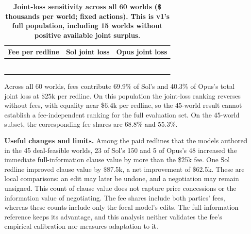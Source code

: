 \renewcommand{\thetable}{E.12}
\begin{longtable}[]{@{}
  >{\raggedright\arraybackslash}p{}
  >{\raggedleft\arraybackslash}p{}
  >{\raggedleft\arraybackslash}p{}@{}}
\caption{\textbf{Joint-loss sensitivity across all 60 worlds (\$ thousands per world; fixed actions). This is v1's full population, including 15 worlds without positive available joint surplus.}}\label{tab:E.12}\tabularnewline
\toprule\noalign{}
\begin{minipage}[b]{\linewidth}\raggedright
Fee per redline
\end{minipage} & \begin{minipage}[b]{\linewidth}\raggedleft
Sol joint loss
\end{minipage} & \begin{minipage}[b]{\linewidth}\raggedleft
Opus joint loss
\end{minipage} \\
\midrule\noalign{}
\endhead
\bottomrule\noalign{}
\endlastfoot
0 & 31.1 & 42.3 \\
5 & 45.6 & 48.0 \\
12.5 & 67.3 & 56.6 \\
25 & 103.4 & 70.8 \\
50 & 175.7 & 99.4 \\
100 & 320.3 & 156.5 \\
\end{longtable}

Across all 60 worlds, fees contribute 69.9\% of Sol's and 40.3\% of Opus's total joint loss at \$25k per redline. On this
population the joint-loss ranking reverses without fees, with equality near \$6.4k per redline, so the 45-world result
cannot establish a fee-independent ranking for the full evaluation set. On the 45-world subset, the corresponding fee
shares are 68.8\% and 55.3\%.

\textbf{Useful changes and limits.} Among the paid redlines that the models authored in the 45 deal-feasible worlds, 23 of
Sol's 150 and 5 of Opus's 48 increased the immediate full-information clause value by more than the \$25k fee. One Sol
redline improved clause value by \$87.5k, a net improvement of \$62.5k. These are local comparisons: an edit may later be
undone, and a negotiation may remain unsigned. This count of clause value does not capture price concessions or the
information value of negotiating. The fee shares include both parties' fees, whereas these counts include only the
focal model's edits. The full-information reference keeps its advantage, and this analysis neither validates the fee's
empirical calibration nor measures adaptation to it.

